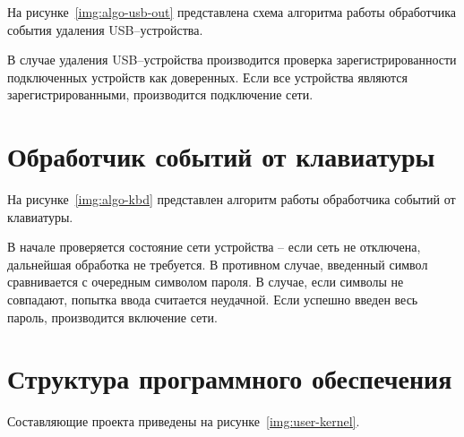 На рисунке~\ref{img:algo-usb-out} представлена схема алгоритма работы обработчика события удаления USB--устройства.

В случае удаления USB--устройства производится проверка зарегистрированности подключенных устройств как доверенных. Если все устройства являются зарегистрированными, производится подключение сети.



\section{Обработчик событий от клавиатуры}
\label{sect:kbd-handler-design}

На рисунке~\ref{img:algo-kbd} представлен алгоритм работы обработчика событий от клавиатуры.


В начале проверяется состояние сети устройства -- если сеть не отключена, дальнейшая обработка не требуется. В противном случае, введенный символ сравнивается с очередным символом пароля. В случае, если символы не совпадают, попытка ввода считается неудачной. Если успешно введен весь пароль, производится включение сети.

\section{Структура программного обеспечения}

Составляющие проекта приведены на рисунке~\ref{img:user-kernel}.

